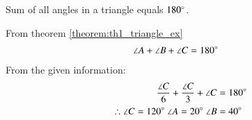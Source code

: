 \begin{theorem}\label{theorem:th1_triangle_ex}
Sum of all angles in a triangle equals $180\degree$.
\end{theorem}
\solution  From theorem \ref{theorem:th1_triangle_ex}
\begin{align}
\angle A + \angle B + \angle C &=  180\degree
\end{align}
From the given information:
\begin{align}
\frac{\angle C}{6} + \frac{\angle C}{3} + \angle C &=  180\degree\\
\therefore \angle C = 120\degree \ \angle A = 20\degree \ \angle B &= 40\degree \nonumber
\end{align}




